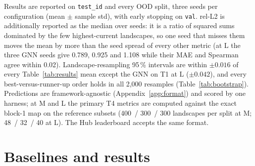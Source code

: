 \documentclass{article}
\newcommand{\relltwo}{rel-L2}
\newcommand{\code}[1]{\texttt{#1}}
\begin{document}
Results are reported on \code{test\_id} and every OOD split, three seeds per configuration (mean $\pm$ sample std), with early stopping on \code{val}. \relltwo{} is additionally reported as the median over seeds: it is a ratio of squared sums dominated by the few highest-current landscapes, so one seed that misses them moves the mean by more than the seed spread of every other metric (at L the three GNN seeds give 0.789, 0.925 and 1.108 while their MAE and Spearman agree within 0.02). Landscape-resampling 95\,\% intervals are within $\pm 0.016$ of every Table~\ref{tab:results} mean except the GNN on T1 at L ($\pm 0.042$), and every best-versus-runner-up order holds in all 2,000 resamples (Table~\ref{tab:bootstrap}). Predictions are framework-agnostic (Appendix~\ref{app:format}) and scored by one harness; at M and L the primary T4 metrics are computed against the exact block-1 map on the reference subsets (400~/ 300~/ 300 landscapes per split at M; 48~/ 32~/ 40 at L). The Hub leaderboard accepts the same format.

\section{Baselines and results}
\label{sec:results}
\end{document}
